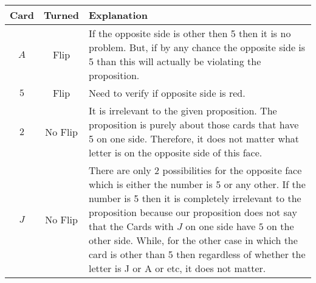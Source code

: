 \documentclass[addpoints]{exam}
\begin{document}
\begin{questions}
\begin{solution}
      \begin{tabularx}{\textwidth}{c|c|X}
        Card & Turned  & Explanation                                                                                                                                                                                                                                                                                                                                                                                                            \\\hline\hline
        $A$  & Flip    & If the opposite side is other then 5 then it is no problem. But, if by any chance the opposite side is 5 than this will actually be violating the proposition.                                                                                                                                                                                                                                                         \\\hline
        $5$  & Flip    & Need to verify if opposite side is red.                                                                                                                                                                                                                                                                                                                                                                                \\\hline
        $2$  & No Flip & It is irrelevant to the given proposition. The proposition is purely about those cards that have 5 on one side. Therefore, it does not matter what letter is on the opposite side of this face.                                                                                                                                                                                                                        \\\hline
        $J$  & No Flip & There are only 2 possibilities for the opposite face which is either the number is 5 or any other. If the number is 5 then it is completely irrelevant to the proposition because our proposition does not say that the Cards with $J$ on one side have $5$ on the other side. While, for the other case in which the card is other than 5 then regardless of whether the letter is J or A or etc, it does not matter.
      \end{tabularx}
    

\end{solution}
\end{questions}
\end{document}
